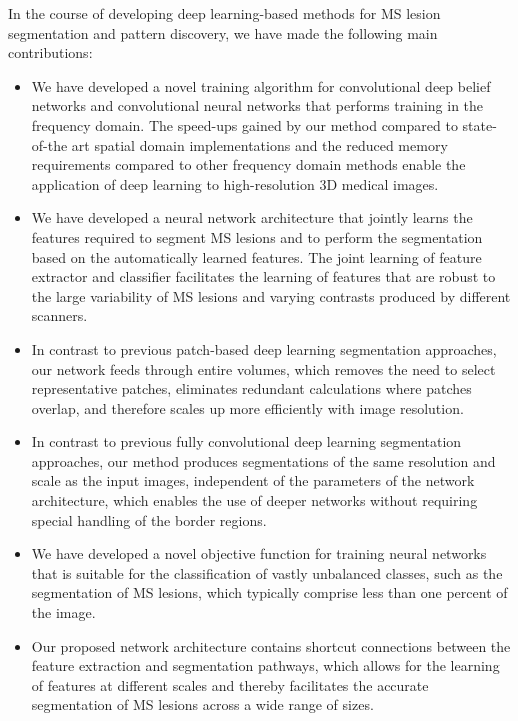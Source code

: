 In the course of developing deep learning-based methods for MS lesion
segmentation and pattern discovery, we have made the following main
contributions:
\begin{itemize}

\item We have developed a novel training algorithm for convolutional deep belief
networks and convolutional neural networks that performs training in the
frequency domain. The speed-ups gained by our method compared to state-of-the
art spatial domain implementations and the reduced memory requirements compared
to other frequency domain methods enable the application of deep learning to
high-resolution 3D medical images.
  
\item We have developed a neural network architecture that jointly learns the
features required to segment MS lesions and to perform the segmentation based on
the automatically learned features. The joint learning of feature extractor and
classifier facilitates the learning of features that are robust to the large
variability of MS lesions and varying contrasts produced by different scanners.

\item In contrast to previous patch-based deep learning segmentation approaches,
our network feeds through entire volumes, which removes the need to select
representative patches, eliminates redundant calculations where patches overlap,
and therefore scales up more efficiently with image resolution.

\item In contrast to previous fully convolutional deep learning segmentation
approaches, our method produces segmentations of the same resolution and scale
as the input images, independent of the parameters of the network architecture,
which enables the use of deeper networks without requiring special handling
of the border regions.

\item We have developed a novel objective function for training neural networks
that is suitable for the classification of vastly unbalanced classes, such as
the segmentation of MS lesions, which typically comprise less than one percent
of the image.

\item Our proposed network architecture contains shortcut connections between
the feature extraction and segmentation pathways, which allows for the learning
of features at different scales and thereby facilitates the accurate
segmentation of MS lesions across a wide range of sizes.


\end{itemize}
